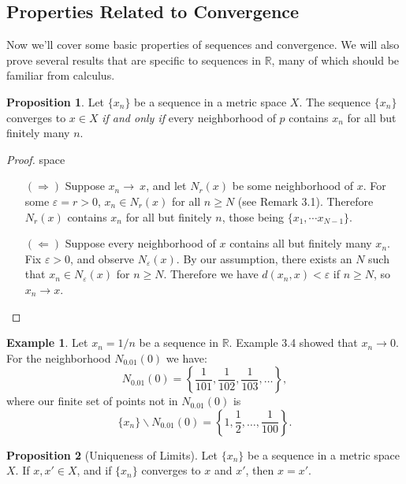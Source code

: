 \documentclass{article}
\newcommand{\R}{\mathbb{R}}
\theoremstyle{definition}
\newtheorem{proposition}{Proposition}[section]
\newtheorem{example}{Example}[section]
\begin{document}
\subsection{Properties Related to Convergence}
Now we'll cover some basic properties of sequences and convergence. We will also prove several results that are specific to sequences in $ \R $, many of which should be familiar from calculus. 
\begin{proposition}
	Let $ \{x_n\} $ be a sequence in a metric space $ X $. The sequence $ \{x_n\} $ converges to $ x\in X $ \textit{if and only if} every neighborhood of $ p $ contains $ x_n $ for all but finitely many $ n $.  
\end{proposition}
\begin{proof}{\color{white}space}
	\begin{enumerate}
		\item [$ (\Longrightarrow) $] Suppose $ x_n\to\ x $, and let $ N_r(x) $ be some neighborhood of $ x $. For some $ \varepsilon=r>0 $, $ x_n\in N_r(x) $ for all $ n\ge N $ (see Remark 3.1). Therefore $ N_r(x) $ contains $ x_n $ for all but finitely $ n $, those being $ \{x_1,\cdots x_{N-1}\} $.  
		\item [$ (\Longleftarrow) $] Suppose every neighborhood of $ x $ contains all but finitely many $ x_n $. Fix $ \varepsilon >0 $, and observe $ N_\varepsilon(x) $. By our assumption, there exists an $ N $ such that $ x_n\in N_\varepsilon(x) $ for $ n\ge N $. Therefore we have $ d(x_n,x)<\varepsilon $ if $ n\ge N $, so $ x_n\to x $.   
	\end{enumerate}
\end{proof}
\begin{example}
Let $ x_n=1/n $ be a sequence in $ \R $. Example 3.4 showed that $ x_n\to 0 $. For the neighborhood $ N_{0.01}(0) $ we have: $$ N_{0.01}(0)=\left\{\frac{1}{101},\frac{1}{102},\frac{1}{103},\ldots\right\}, $$ where our finite set of points not in $ N_{0.01}(0) $ is $$\{x_n\}\backslash N_{0.01}(0)=\left\{1,\frac{1}{2},\ldots, \frac{1}{100}\right\}.$$
\end{example}
\begin{proposition}[Uniqueness of Limits]
	Let $ \{x_n\} $ be a sequence in a metric space $ X $. If $ x,x'\in X $, and if $ \{x_n\} $ converges to $ x $ and $ x' $, then $ x=x' $.
\end{proposition}
\end{document}
